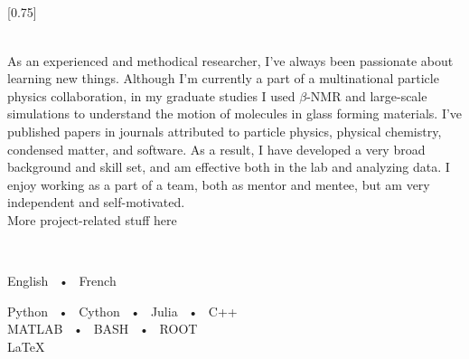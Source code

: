 \documentclass[lighthipster]{simplehipstercv}
\begin{document}
\thispagestyle{empty}

\subsection*{}

\vspace{5.38em}

\setlength{\columnsep}{1.5cm}
[0.75]
\begin{paracol}{2}

\paracolbackgroundoptions


\footnotesize
{\setasidefontcolour
{}

\hfill{}\\[0.5em]

{\footnotesize
As an experienced and methodical researcher, I've always been passionate about learning new things. Although I'm currently a part of a multinational particle \\physics collaboration, in my graduate studies I used $\beta$-NMR and large-scale simulations to understand the motion of molecules in glass forming materials. I've published papers in journals attributed to particle physics, physical chemistry, condensed matter, and software. As a result, I have developed a very broad background and skill set, and am effective both in the lab and analyzing data. I enjoy working as a part of a team, both as mentor and mentee, but am very independent and self-motivated.\\

More project-related stuff here
\lipsum[110]
}
\bigskip

\hfill{} \\

\vspace{-0.3cm}
\flushright
{
    English ~•~ French

    \bigskip

    Python ~•~ Cython ~•~ Julia ~•~ C++ \\ MATLAB ~•~ BASH ~•~ ROOT \\ \LaTeX
}



}
\end{paracol}
\end{document}
